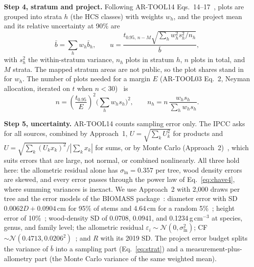 \documentclass[conference,a4paper]{IEEEtran}
\begin{document}
\textbf{Step 4, stratum and project.} Following AR-TOOL14 Eqs.~14--17~\cite{artool14}, plots are grouped into strata $h$ (the HCS classes) with weights $w_h$, and the project mean and its relative uncertainty at 90\% are
\begin{equation}
\bar b=\sum_h w_h \bar b_h,\qquad u=\frac{t_{0.95,\,n-M}\sqrt{\sum_h w_h^2 s_h^2/n_h}}{\bar b},
\label{eq:strat}
\end{equation}
with $s_h^2$ the within-stratum variance, $n_h$ plots in stratum $h$, $n$ plots in total, and $M$ strata. The mapped stratum areas are not public, so the plot shares stand in for $w_h$. The number of plots needed for a margin $E$ (AR-TOOL03 Eq.~2, Neyman allocation, iterated on $t$ when $n<30$)~\cite{artool03} is
\begin{equation}
n=\left(\frac{t_{0.95}}{E}\right)^2\Big(\sum_h w_h s_h\Big)^2,\qquad n_h=n\,\frac{w_h s_h}{\sum_h w_h s_h}.
\label{eq:nplots}
\end{equation}

\textbf{Step 5, uncertainty.} AR-TOOL14 counts sampling error only. The IPCC asks for all sources, combined by Approach~1, $U=\sqrt{\sum_k U_k^2}$ for products and $U=\sqrt{\sum_k(U_kx_k)^2}/|\sum_k x_k|$ for sums, or by Monte Carlo (Approach~2)~\cite{ipcc2006v1}, which suits errors that are large, not normal, or combined nonlinearly. All three hold here: the allometric residual alone has $\sigma_{\ln}=0.357$ per tree, wood density errors are skewed, and every error passes through the power law of Eq.~\ref{eq:chave4}, where summing variances is inexact. We use Approach~2 with 2{,}000 draws per tree and the error models of the BIOMASS package~\cite{rejou2017biomass}: diameter error with SD $0.0062D+0.0904$\,cm for 95\% of stems and 4.64\,cm for a random 5\%~\cite{chave2004error}; height error of 10\%~\cite{chave2004error}; wood-density SD of 0.0708, 0.0941, and 0.1234\,g\,cm$^{-3}$ at species, genus, and family level; the allometric residual $\varepsilon_i\sim\mathcal N(0,\sigma_{\ln}^2)$; CF $\sim\mathcal N(0.4713,0.0206^2)$~\cite{thomas2012carbon}; and $R$ with its 2019 SD. The project error budget splits the variance of $\bar b$ into a sampling part (Eq.~\ref{eq:strat}) and a measurement-plus-allometry part (the Monte Carlo variance of the same weighted mean).
\end{document}
